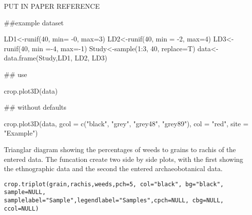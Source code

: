 \documentclass[a4paper]{book}
\begin{document}
%
\begin{References}\relax
PUT IN PAPER REFERENCE
\end{References}
%
\begin{Examples}
\begin{ExampleCode}
##example dataset

LD1<-runif(40, min= -0, max=3)
LD2<-runif(40, min = -2, max=4)
LD3<-runif(40, min =-4, max=-1)
Study<-sample(1:3, 40, replace=T)
data<-data.frame(Study,LD1, LD2, LD3)

## use

crop.plot3D(data)

## without defaults

crop.plot3D(data, gcol = c("black", "grey", "grey48", "grey89"),
col = "red", site = "Example")
\end{ExampleCode}
\end{Examples}
%
\begin{Description}\relax
Trianglar diagram showing the percentages of weeds to grains to rachis of the entered data. The funcation create two side by side plots, with the first showing the ethnographic data and the second the entered archaeobotanical data.
\end{Description}
%
\begin{Usage}
\begin{verbatim}
crop.triplot(grain,rachis,weeds,pch=5, col="black", bg="black", sample=NULL,
samplelabel="Sample",legendlabel="Samples",cpch=NULL, cbg=NULL, ccol=NULL)

\end{verbatim}
\end{Usage}
%
\end{document}
